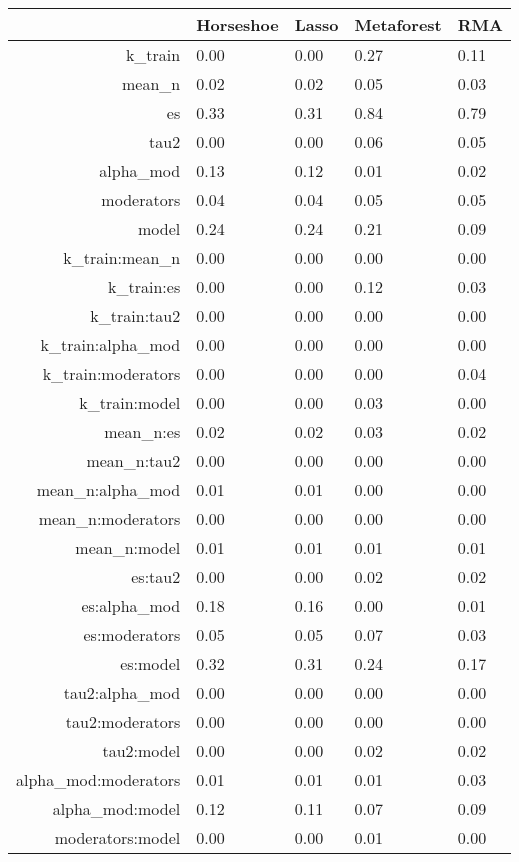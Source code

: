 \begin{table}[ht]
\centering
\begin{tabular}{rllll}
  \hline
 & Horseshoe & Lasso & Metaforest & RMA \\ 
  \hline
k_train              & 0.00 & 0.00 & 0.27 & 0.11 \\ 
  mean_n               & 0.02 & 0.02 & 0.05 & 0.03 \\ 
  es                   & 0.33 & 0.31 & 0.84 & 0.79 \\ 
  tau2                 & 0.00 & 0.00 & 0.06 & 0.05 \\ 
  alpha_mod            & 0.13 & 0.12 & 0.01 & 0.02 \\ 
  moderators           & 0.04 & 0.04 & 0.05 & 0.05 \\ 
  model                & 0.24 & 0.24 & 0.21 & 0.09 \\ 
  k_train:mean_n       & 0.00 & 0.00 & 0.00 & 0.00 \\ 
  k_train:es           & 0.00 & 0.00 & 0.12 & 0.03 \\ 
  k_train:tau2         & 0.00 & 0.00 & 0.00 & 0.00 \\ 
  k_train:alpha_mod    & 0.00 & 0.00 & 0.00 & 0.00 \\ 
  k_train:moderators   & 0.00 & 0.00 & 0.00 & 0.04 \\ 
  k_train:model        & 0.00 & 0.00 & 0.03 & 0.00 \\ 
  mean_n:es            & 0.02 & 0.02 & 0.03 & 0.02 \\ 
  mean_n:tau2          & 0.00 & 0.00 & 0.00 & 0.00 \\ 
  mean_n:alpha_mod     & 0.01 & 0.01 & 0.00 & 0.00 \\ 
  mean_n:moderators    & 0.00 & 0.00 & 0.00 & 0.00 \\ 
  mean_n:model         & 0.01 & 0.01 & 0.01 & 0.01 \\ 
  es:tau2              & 0.00 & 0.00 & 0.02 & 0.02 \\ 
  es:alpha_mod         & 0.18 & 0.16 & 0.00 & 0.01 \\ 
  es:moderators        & 0.05 & 0.05 & 0.07 & 0.03 \\ 
  es:model             & 0.32 & 0.31 & 0.24 & 0.17 \\ 
  tau2:alpha_mod       & 0.00 & 0.00 & 0.00 & 0.00 \\ 
  tau2:moderators      & 0.00 & 0.00 & 0.00 & 0.00 \\ 
  tau2:model           & 0.00 & 0.00 & 0.02 & 0.02 \\ 
  alpha_mod:moderators & 0.01 & 0.01 & 0.01 & 0.03 \\ 
  alpha_mod:model      & 0.12 & 0.11 & 0.07 & 0.09 \\ 
  moderators:model     & 0.00 & 0.00 & 0.01 & 0.00 \\ 
   \hline
\end{tabular}
\end{table}

